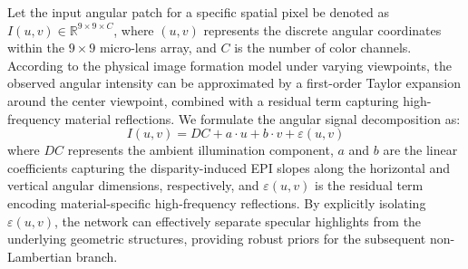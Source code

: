 Let the input angular patch for a specific spatial pixel be denoted as $I(u,v) \in \mathbb{R}^{9 \times 9 \times C}$, where $(u,v)$ represents the discrete angular coordinates within the $9 \times 9$ micro-lens array, and $C$ is the number of color channels. According to the physical image formation model under varying viewpoints, the observed angular intensity can be approximated by a first-order Taylor expansion around the center viewpoint, combined with a residual term capturing high-frequency material reflections. We formulate the angular signal decomposition as:
\begin{equation}
\label{eq:eq6}
I(u,v) = DC + a \cdot u + b \cdot v + \varepsilon(u,v)
\end{equation}
where $DC$ represents the ambient illumination component, $a$ and $b$ are the linear coefficients capturing the disparity-induced EPI slopes along the horizontal and vertical angular dimensions, respectively, and $\varepsilon(u,v)$ is the residual term encoding material-specific high-frequency reflections. By explicitly isolating $\varepsilon(u,v)$, the network can effectively separate specular highlights from the underlying geometric structures, providing robust priors for the subsequent non-Lambertian branch.